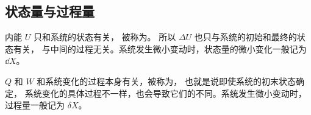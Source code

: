 \subsection{状态量与过程量}
内能 $U$ 只和系统的状态有关， 被称为。 所以 $\Delta U$ 也只与系统的初始和最终的状态有关， 与中间的过程无关。系统发生微小变动时，状态量的微小变化一般记为 $\dd X$。

$Q$ 和 $W$ 和系统变化的过程本身有关，被称为， 也就是说即使系统的初末状态确定， 系统变化的具体过程不一样，也会导致它们的不同。系统发生微小变动时，过程量一般记为 $\delta X$。


